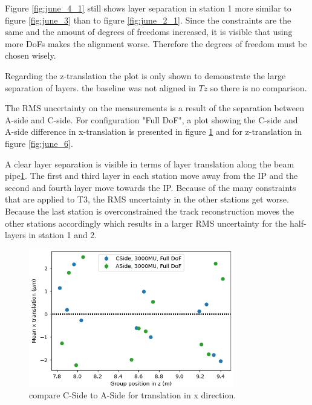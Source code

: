 Figure \ref{fig:june_4_1} still shows layer separation in station 1 more similar to figure \ref{fig:june_3} than to figure \ref{fig:june_2_1}.
Since the constraints are the same and the amount of degrees of freedoms increased,
it is visible that using more DoFs makes the alignment worse. Therefore the degrees of freedom must be chosen wisely.

Regarding the z-translation the plot is only shown to demonstrate the large separation of layers. the baseline was not aligned in $Tz$ so there is no comparison.

The RMS uncertainty on the measurements is a result of the separation between A-side and C-side. For configuration "Full DoF", a plot showing the C-side and A-side difference in x-translation is presented in figure \ref{fig:june_5} and for z-translation in figure \ref{fig:june_6}.

A clear layer separation is visible in terms of layer translation along the beam pipe\ref{fig:june_5}.
The first and third layer in each station move away from the IP and the second and
fourth layer move towards the IP.
Because of the many constraints that are applied to T3, the RMS uncertainty in the other stations get worse. Because the last station is overconstrained the track reconstruction moves the other stations accordingly which results in a larger RMS uncertainty for the half-layers in station 1 and 2.

\begin{figure}
  \centering
  \includegraphics[width=0.8\textwidth]{plots/renewed_plots/CA_allT_halfT3_Tx.png}
  \caption{compare C-Side to A-Side for translation in x direction.}
  \label{fig:june_5}
\end{figure}

